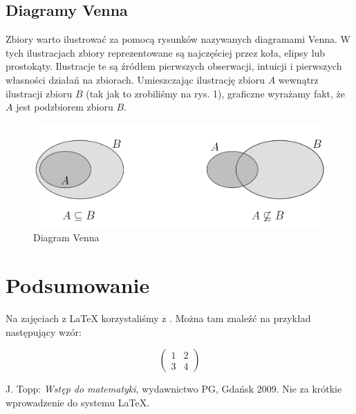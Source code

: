 \documentclass[a4paper,12pt]{article}
\theoremstyle{remark}
\begin{document}
\subsection{Diagramy Venna}

Zbiory warto ilustrować za pomocą rysunków nazywanych diagramami Venna. W tych ilustracjach zbiory reprezentowane są najczęściej przez koła, elipsy lub prostokąty. Ilustracje te są źródłem pierwszych obserwacji, intuicji i pierwszych własności działań na zbiorach. Umieszczając ilustrację zbioru $A$ wewnątrz ilustracji zbioru $B$ (tak jak to zrobiliśmy na rys. 1), graficzne wyrażamy fakt, że $A$ jest podzbiorem zbioru $B$.

\begin{figure}[h]
    \centering
    \includegraphics[width=\textwidth]{diagramy.png}
    \caption{Diagram Venna}
\end{figure}

\section{Podsumowanie}

Na zajęciach z {\LaTeX} korzystaliśmy z \cite{NZKWDSL}. Można tam znaleźć na przykład następujący wzór:

\begin{equation*}
    \left(
        \begin{array}{c|c}
            1 & 2 \\
            \hline
            3 & 4
        \end{array}
    \right)
\end{equation*}

\newpage

\begin{thebibliography}{00}
        J. Topp: \textit{Wstęp do matematyki}, wydawnictwo PG, Gdańsk 2009.
        Nie za krótkie wprowadzenie do systemu {\LaTeX}.
\end{thebibliography}
\end{document}
